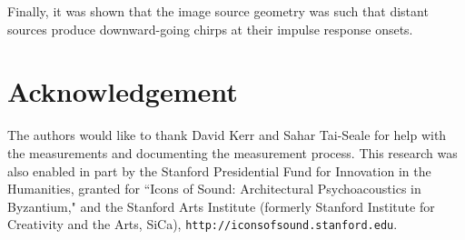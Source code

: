 \documentclass{aes137}
\begin{document}
Finally, it was shown that the image source geometry was such that distant sources produce downward-going chirps at their impulse response onsets. 


\section{Acknowledgement}
The authors would like to thank David Kerr and Sahar Tai-Seale for help with the measurements and documenting the measurement process. This research was also enabled in part by the Stanford Presidential Fund for Innovation in the Humanities, granted for ``Icons of Sound: Architectural Psychoacoustics in Byzantium," and the Stanford Arts Institute (formerly Stanford Institute for Creativity and the Arts, SiCa), {\tt http://iconsofsound.stanford.edu}.

%
%




%
%
\end{document}
